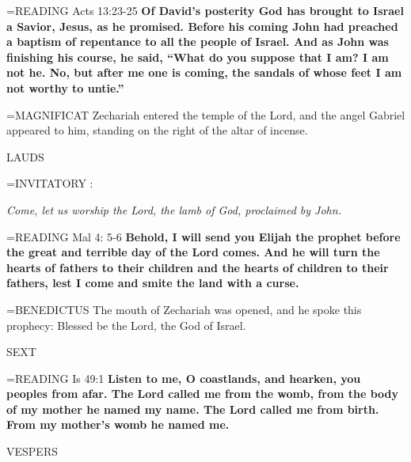 \hangindent=\parindent \small{READING} Acts 13:23-25 \textbf{Of David’s posterity God has brought to Israel a
Savior, Jesus, as he promised. Before his coming John had preached
a baptism of repentance to all the people of Israel. And as John was
finishing his course, he said, “What do you suppose that I am? I am
not he. No, but after me one is coming, the sandals of whose feet I
am not worthy to untie.”\\}
 
\hangindent=\parindent \small{MAGNIFICAT  Zechariah entered the temple of the Lord, and the
angel Gabriel appeared to him, standing on the right of the altar of
incense.\\}
 
\begin{flushleft}\normalsize LAUDS\\\end{flushleft}

\hangindent=\parindent \small{INVITATORY :}
\begin{center}
\textit{Come, let us worship the Lord, the lamb of God, proclaimed by John.\\}
\end{center}

\hangindent=\parindent \small{READING} Mal 4: 5-6 \textbf{Behold, I will send you Elijah the prophet before
the great and terrible day of the Lord comes. And he will turn the
hearts of fathers to their children and the hearts of children to their
fathers, lest I come and smite the land with a curse.\\}
 
\hangindent=\parindent \small{BENEDICTUS  The mouth of Zechariah was opened, and he spoke this
prophecy: Blessed be the Lord, the God of Israel.\\}
 
\begin{flushleft}\normalsize SEXT\\\end{flushleft}

\hangindent=\parindent \small{READING} Is 49:1 \textbf{Listen to me, O coastlands, and hearken, you peoples
from afar. The Lord called me from the womb, from the body of
my mother he named my name.
The Lord called me from birth.
From my mother’s womb he named me.}
 
\begin{flushleft}\normalsize VESPERS\\\end{flushleft}


